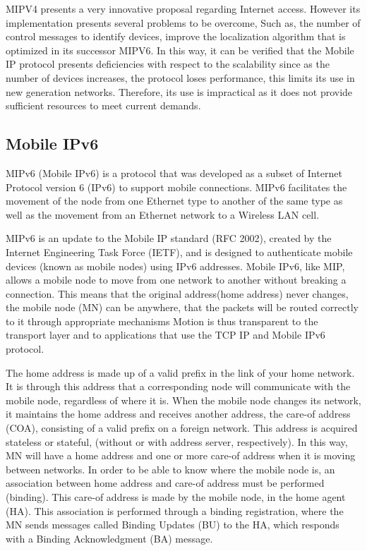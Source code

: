 \documentclass[12pt]{article}
\begin{document}
MIPV4 presents a very innovative proposal regarding Internet access. However its implementation presents several problems to be overcome, Such as, the number of control messages to identify devices, improve the localization algorithm that is optimized in its successor MIPV6. In this way, it can be verified that the Mobile IP protocol presents deficiencies with respect to the scalability since as the number of devices increases, the protocol loses performance, this limits its use in new generation networks. Therefore, its use is impractical as it does not provide sufficient resources to meet current demands.

\subsection{Mobile IPv6}

MIPv6 (Mobile IPv6) is a protocol that was developed as a subset of Internet Protocol version 6 (IPv6) to support mobile connections. MIPv6 facilitates the movement of the node from one Ethernet type to another of the same type as well as the movement from an Ethernet network to a Wireless LAN cell.

MIPv6 is an update to the Mobile IP standard (RFC 2002), created by the Internet Engineering Task Force (IETF), and is designed to authenticate mobile devices (known as mobile nodes) using IPv6 addresses. Mobile IPv6, like MIP, allows a mobile node to move from one network to another without breaking a connection. This means that the original address(home address) never changes, the mobile node (MN) can be anywhere, that the packets will be routed correctly to it through appropriate mechanisms Motion is thus transparent to the transport layer and to applications that use the TCP IP and Mobile IPv6 protocol.

The home address is made up of a valid prefix in the link of your home network. It is through this address that a corresponding node will communicate with the mobile node, regardless of where it is. When the mobile node changes its network, it maintains the home address and receives another address, the care-of address (COA), consisting of a valid prefix on a foreign network. This address is acquired stateless or stateful, (without or with address server, 
respectively). In this way, MN will have a home address and one or more care-of address when it is moving between networks. In order to be able to know where the mobile node is, an association between home address and care-of address must be performed (binding). This care-of address is made by the mobile node, in the home agent (HA). This association is performed through a binding registration, where the MN sends messages called Binding Updates (BU) to the HA, which responds with a Binding Acknowledgment (BA) message.
\end{document}
